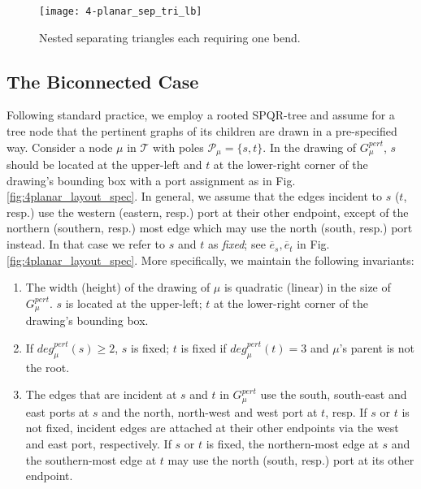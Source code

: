 \documentclass[a4paper,twoside,11pt]{article}
\newcommand{\pert}[1]{G^\textit{pert}_{#1}}
\newcommand{\pdeg}[2]{\textit{deg}^{\textit{pert}}_{#1}(#2)}
\begin{document}
\begin{figure}[t]
    \centering
    \texttt{[image: 4-planar\_sep\_tri\_lb]}
    \caption{Nested separating triangles each requiring one bend.}
    \label{fig:4p_lowerbound}
\end{figure}

\subsection{The Biconnected Case}
\label{sec:4bicon}


Following standard practice, we employ a rooted SPQR-tree and assume
for a tree node that the pertinent graphs of its children are drawn
in a pre-specified way. Consider a node $\mu$ in $\mathcal{T}$ with
poles $\mathcal{P}_\mu = \{ s, t \}$. In the drawing of
$\pert{\mu}$, $s$ should be located at the upper-left and $t$ at the
lower-right corner of the drawing's bounding box with a port
assignment as in Fig.\ref{fig:4planar_layout_spec}. In general, we
assume that the edges incident to $s$ ($t$, resp.) use the western
(eastern, resp.) port at their other endpoint, except of the
northern (southern, resp.) most edge which may use the north (south,
resp.) port instead. In that case we refer to $s$ and $t$ as
\emph{fixed}; see $\overline{e}_s, \overline{e}_t$ in
Fig.\ref{fig:4planar_layout_spec}. More specifically, we maintain
the following invariants:

\begin{enumerate}[{I}P-1:]
\item \label{ip:1} The width (height) of the drawing of $\mu$ is
quadratic (linear) in the size of $\pert{\mu}$. $s$ is located at
the upper-left; $t$ at the lower-right corner of the drawing's
bounding box.
\item \label{ip:2} If $\pdeg{\mu}{s} \geq 2$, $s$ is fixed;
$t$ is fixed if $\pdeg{\mu}{t} = 3$ and $\mu$'s parent is not the
root.
\item \label{ip:3} The edges that are incident at $s$ and $t$ in
$\pert{\mu}$ use the south, south-east and east ports at $s$ and the
north, north-west and west port at $t$, resp. If $s$ or $t$ is not
fixed, incident edges are attached at their other endpoints via the
west and east port, respectively. If $s$ or $t$ is fixed, the
northern-most edge at $s$ and the southern-most edge at $t$ may use
the north (south, resp.) port at its other endpoint.
\end{enumerate}
\end{document}
